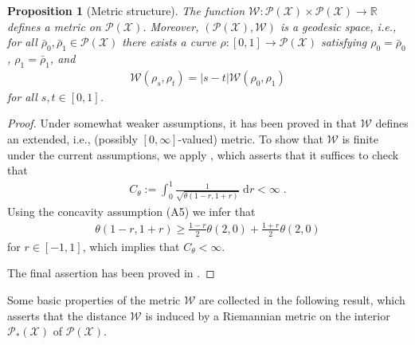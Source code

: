 \documentclass[a4paper,11pt,reqno]{amsart}
\theoremstyle{plain}
\newtheorem{proposition}[theorem]{Proposition}
\theoremstyle{remark}
\numberwithin{equation}{section}
\begin{document}
\begin{proposition}[Metric structure]\label{prop:W-metric}
  The function ${\mathcal{W}} : {{\mathscr{P}}({\mathcal{X}})} \times {{\mathscr{P}}({\mathcal{X}})} \to {{\mathbb R}}$ defines a metric on
  ${{\mathscr{P}}({\mathcal{X}})}$. Moreover, $({{\mathscr{P}}({\mathcal{X}})},{\mathcal{W}})$ is a geodesic space, i.e., for all
  $\bar\rho_0, \bar\rho_1 \in {{\mathscr{P}}({\mathcal{X}})}$ there exists a curve $\rho : [0,1]
  \to {{\mathscr{P}}({\mathcal{X}})}$ satisfying $\rho_0 = \bar \rho_0$, $\rho_1 = \bar \rho_1$,
  and
\begin{align*}
 {\mathcal{W}}(\rho_s, \rho_t) =  |s-t|  {\mathcal{W}}(\rho_0, \rho_1) 
\end{align*}
for all $s, t \in [0,1]$.
\end{proposition}

\begin{proof}
  Under somewhat weaker assumptions, it has been proved in
  \cite{Ma11} that ${\mathcal{W}}$ defines an extended, i.e., (possibly
  $[0,\infty]$-valued) metric. To show that ${\mathcal{W}}$ is finite under the
  current assumptions, we apply \cite[Theorem 3.12]{Ma11}, which
  asserts that it suffices to check that
\begin{align*}
C_\theta := \int_0^1 \frac{1}{\sqrt{\theta(1-r, 1+r)}} {\; \mathrm{d}}  r < \infty \;.
\end{align*}
Using the concavity assumption (A5) we infer that
\begin{align*}
 \theta(1-r, 1+r) \geq \frac{1-r}{2} \theta(2,0) + \frac{1+r}{2} \theta(2,0)
\end{align*}
for $r \in [-1,1]$, which implies that $C_\theta < \infty$.

The final assertion has been proved in \cite[Theorem 3.2]{EM11}.
\end{proof}

Some basic properties of the metric ${\mathcal{W}}$ are collected in the following
result, which asserts that the distance ${\mathcal{W}}$ is induced by a
Riemannian metric on the interior ${{\mathscr{P}}_*({\mathcal{X}})}$ of ${{\mathscr{P}}({\mathcal{X}})}$. 
\end{document}
